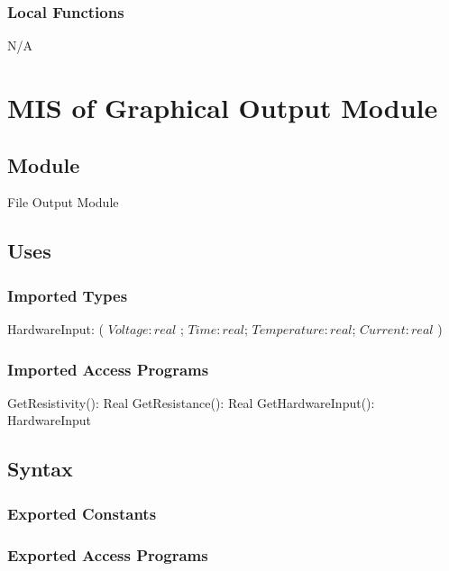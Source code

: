 \documentclass[12pt, titlepage]{article}
\begin{document}
\subsubsection{Local Functions}

N/A

\newpage

\section{MIS of Graphical Output Module} \label{GO} 

\subsection{Module}

File Output Module

\subsection{Uses}

\subsubsection{Imported Types}

HardwareInput: ( $Voltage: real $ ; $Time: real$; $Temperature: real$; $Current: real$ )\\

\subsubsection{Imported Access Programs}

  GetResistivity(): Real
  GetResistance(): Real
  GetHardwareInput(): HardwareInput

\subsection{Syntax}

\subsubsection{Exported Constants}

\subsubsection{Exported Access Programs}
\end{document}
